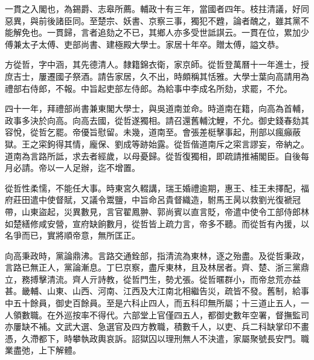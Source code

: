 \begin{pinyinscope}
一貫之入閣也，為錫爵、志皋所薦。輔政十有三年，當國者四年。枝拄清議，好同惡異，與前後諸臣同。至楚宗、妖書、京察三事，獨犯不韙，論者醜之，雖其黨不能解免也。一貫歸，言者追劾之不已，其鄉人亦多受世詆諆云。一貫在位，累加少傅兼太子太傅、吏部尚書、建極殿大學士。家居十年卒。贈太傅，謚文恭。

方從哲，字中涵，其先德清人。隸籍錦衣衛，家京師。從哲登萬曆十一年進士，授庶吉士，屢遷國子祭酒。請告家居，久不出，時頗稱其恬雅。大學士葉向高請用為禮部右侍郎，不報。中旨起吏部左侍郎。為給事中李成名所劾，求罷，不允。

四十一年，拜禮部尚書兼東閣大學士，與吳道南並命。時道南在籍，向高為首輔，政事多決於向高。向高去國，從哲遂獨相。請召還舊輔沈鯉，不允。御史錢春劾其容悅，從哲乞罷。帝優旨慰留。未幾，道南至。會張差梃擊事起，刑部以瘋癲蔽獄。王之寀鉤得其情，龐保、劉成等跡始露。從哲偕道南斥之寀言謬妄，帝納之。道南為言路所詆，求去者經歲，以母憂歸。從哲復獨相，即疏請推補閣臣。自後每月必請。帝以一人足辦，迄不增置。

從哲性柔懦，不能任大事。時東宮久輟講，瑞王婚禮逾期，惠王、桂王未擇配，福府莊田遣中使督賦，又議令鬻鹽，中旨命呂貴督織造，駙馬王昺以救劉光復褫冠帶，山東盜起，災異數見，言官翟鳳翀、郭尚賓以直言貶，帝遣中使令工部侍郎林如楚繕修咸安營，宣府缺餉數月，從哲皆上疏力言，帝多不聽。而從哲有內援，以名爭而已，實將順帝意，無所匡正。

向高秉政時，黨論鼎沸。言路交通銓部，指清流為東林，逐之殆盡。及從哲秉政，言路已無正人，黨論漸息。丁巳京察，盡斥東林，且及林居者。齊、楚、浙三黨鼎立，務搏擊清流。齊人亓詩教，從哲門生，勢尤張。從哲暱群小，而帝怠荒亦益甚。畿輔、山東、山西、河南、江西及大江南北相繼告災，疏皆不發。舊制，給事中五十餘員，御史百餘員。至是六科止四人，而五科印無所屬；十三道止五人，一人領數職。在外巡按率不得代。六部堂上官僅四五人，都御史數年空署，督撫監司亦屢缺不補。文武大選、急選官及四方教職，積數千人，以吏、兵二科缺掌印不畫憑，久滯都下，時攀執政輿哀訴。詔獄囚以理刑無人不決遣，家屬聚號長安門。職業盡弛，上下解體。


\end{pinyinscope}
